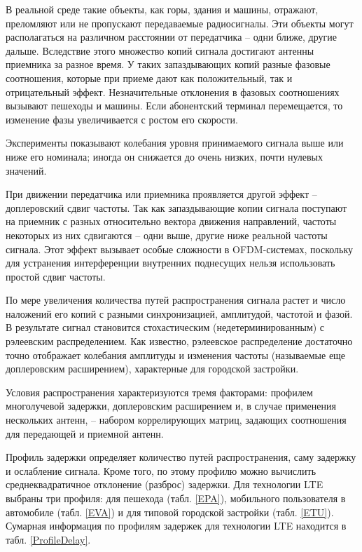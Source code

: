 В реальной среде такие объекты, как горы, здания и машины, отражают, преломляют или не пропускают передаваемые радиосигналы. Эти объекты могут располагаться на различном расстоянии от передатчика – одни ближе, другие дальше. Вследствие этого множество копий сигнала достигают антенны приемника за разное время. У таких запаздывающих копий разные фазовые соотношения, которые при приеме дают как положительный, так и отрицательный эффект. Незначительные отклонения в фазовых соотношениях вызывают пешеходы и машины. Если абонентский терминал перемещается, то изменение фазы увеличивается с ростом его скорости.

Эксперименты показывают колебания уровня принимаемого сигнала выше или ниже его номинала; иногда он снижается до очень низких, почти нулевых значений.

При движении передатчика или приемника проявляется другой эффект – доплеровский сдвиг частоты. Так как запаздывающие копии сигнала поступают на приемник с разных относительно вектора движения направлений, частоты некоторых из них сдвигаются – одни выше, другие ниже реальной частоты сигнала. Этот эффект вызывает особые сложности в OFDM-системах, поскольку для устранения интерференции внутренних поднесущих нельзя использовать простой сдвиг частоты.

По мере увеличения количества путей распространения сигнала растет и число наложений его копий с разными синхронизацией, амплитудой, частотой и фазой. В результате сигнал становится стохастическим (недетерминированным) с рэлеевским распределением. Как известно, рэлеевское распределение достаточно точно отображает колебания амплитуды и изменения частоты (называемые еще доплеровским расширением), характерные для городской застройки.

Условия распространения характеризуются тремя факторами: профилем многолучевой задержки, доплеровским расширением и, в случае применения нескольких антенн, – набором коррелирующих матриц, задающих соотношения для передающей и приемной антенн.

Профиль задержки определяет количество путей распространения, саму задержку и ослабление сигнала. Кроме того, по этому профилю можно вычислить среднеквадратичное отклонение (разброс) задержки. Для технологии LTE выбраны три профиля: для пешехода (табл. \ref{EPA}), мобильного пользователя в автомобиле (табл. \ref{EVA}) и для типовой городской застройки (табл. \ref{ETU}). Сумарная информация по профилям задержек для технологии LTE находится в табл. \ref{ProfileDelay}.




